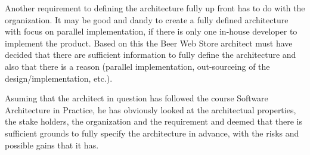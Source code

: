 Another requirement to defining the architecture fully up front has to do with the organization. It may be good and dandy to create a fully defined architecture with focus on parallel implementation, if there is only one in-house developer to implement the product.
Based on this the Beer Web Store architect must have decided that there are sufficient information to fully define the architecture and also that there is a reason (parallel implementation, out-sourceing of the design/implementation, etc.).

Asuming that the architect in question has followed the course Software Architecture in Practice, he has obviously looked at the architectual properties, the stake holders, the organization and the requirement and deemed that there is sufficient grounds to fully specify the architecture in advance, with the risks and possible gains that it has.
